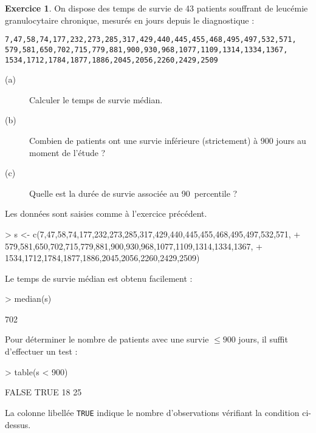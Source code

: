 \documentclass[11pt]{report}
\makeatletter
\theoremstyle{definition}
\newtheorem{exo}{Exercice}[chapter]
\newcommand{\foo}[1]{\texttt{#1}}
\newcommand{\cmd}[1]{\index{#1@\foo{#1}}}
\makeatother
\begin{document}
\begin{exo}\label{exo:2.2}
On dispose des temps de survie de 43 patients souffrant de leucémie
granulocytaire chronique, mesurés en jours depuis le diagnostique :
\autocite[p.~38]{everitt01} 
\begin{verbatim}
7,47,58,74,177,232,273,285,317,429,440,445,455,468,495,497,532,571,
579,581,650,702,715,779,881,900,930,968,1077,1109,1314,1334,1367,
1534,1712,1784,1877,1886,2045,2056,2260,2429,2509
\end{verbatim}
\begin{description}
\item[(a)] Calculer le temps de survie médian. 
\item[(b)] Combien de patients ont une survie inférieure (strictement) à 900
  jours au moment de l'étude ? 
\item[(c)] Quelle est la durée de survie associée au 90\ieme\ percentile ?
\end{description}
\begin{sol}
Les données sont saisies comme à l'exercice précédent.  
\begin{Schunk}
\begin{Sinput}
> s <- c(7,47,58,74,177,232,273,285,317,429,440,445,455,468,495,497,532,571,
+        579,581,650,702,715,779,881,900,930,968,1077,1109,1314,1334,1367,
+        1534,1712,1784,1877,1886,2045,2056,2260,2429,2509)
\end{Sinput}
\end{Schunk}
Le temps de survie médian est obtenu facilement :
\begin{Schunk}
\begin{Sinput}
> median(s)
\end{Sinput}
\begin{Soutput}
[1] 702
\end{Soutput}
\end{Schunk}
\cmd{median}

Pour déterminer le nombre de patients avec une survie $\le 900$ jours, il
suffit d'effectuer un test :
\begin{Schunk}
\begin{Sinput}
> table(s < 900)
\end{Sinput}
\begin{Soutput}
FALSE  TRUE 
   18    25 
\end{Soutput}
\end{Schunk}
\cmd{table}
La colonne libellée \texttt{TRUE} indique le nombre d'observations vérifiant
la condition ci-dessus. 


\end{sol}
\end{exo}
\end{document}
